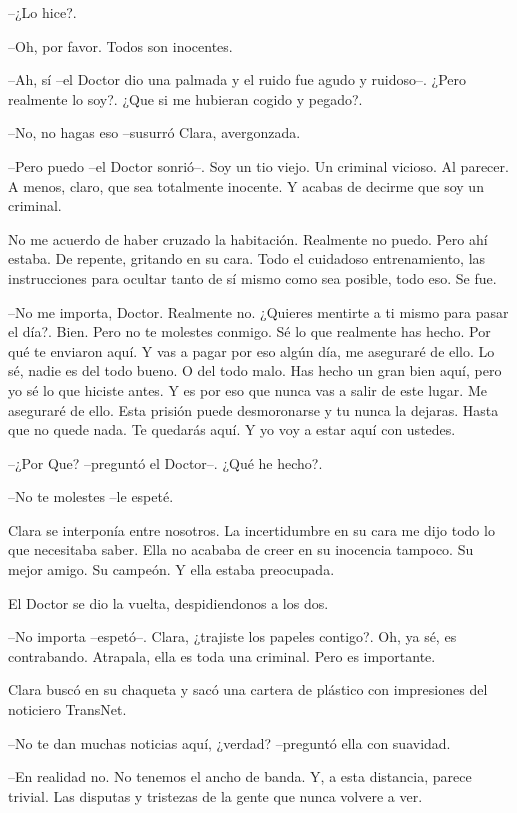 --¿Lo hice?.

--Oh, por favor. Todos son inocentes.

--Ah, sí --el Doctor dio una palmada y el ruido fue agudo y
ruidoso--. ¿Pero realmente lo soy?. ¿Que si me hubieran cogido y
pegado?.

--No, no hagas eso --susurró Clara, avergonzada.

--Pero puedo --el Doctor sonrió--. Soy un tio viejo. Un criminal
vicioso. Al parecer. A menos, claro, que sea totalmente inocente. Y
acabas de decirme que soy un criminal.

No me acuerdo de haber cruzado la habitación. Realmente no puedo. Pero
ahí estaba. De repente, gritando en su cara. Todo el cuidadoso
entrenamiento, las instrucciones para ocultar tanto de sí mismo como sea
posible, todo eso. Se fue.

--No me importa, Doctor. Realmente no. ¿Quieres mentirte a ti mismo
para pasar el día?. Bien. Pero no te molestes conmigo. Sé lo que
realmente has hecho. Por qué te enviaron aquí. Y vas a pagar por eso
algún día, me aseguraré de ello. Lo sé, nadie es del todo bueno. O del
todo malo. Has hecho un gran bien aquí, pero yo sé lo que hiciste antes.
Y es por eso que nunca vas a salir de este lugar. Me aseguraré de ello.
Esta prisión puede desmoronarse y tu nunca la dejaras. Hasta que no
quede nada. Te quedarás aquí. Y yo voy a estar aquí con ustedes.

--¿Por Que? --preguntó el Doctor--. ¿Qué he hecho?.

--No te molestes --le espeté.

Clara se interponía entre nosotros. La incertidumbre en su cara me dijo
todo lo que necesitaba saber. Ella no acababa de creer en su inocencia
tampoco. Su mejor amigo. Su campeón. Y ella estaba preocupada.

El Doctor se dio la vuelta, despidiendonos a los dos.

--No importa --espetó--. Clara, ¿trajiste los papeles contigo?. Oh,
ya sé, es contrabando. Atrapala, ella es toda una criminal. Pero es
importante.

Clara buscó en su chaqueta y sacó una cartera de plástico con
impresiones del noticiero TransNet.

--No te dan muchas noticias aquí, ¿verdad? --preguntó ella con
suavidad.

--En realidad no. No tenemos el ancho de banda. Y, a esta distancia,
parece trivial. Las disputas y tristezas de la gente que nunca volvere a
ver.


